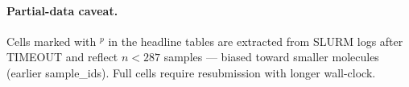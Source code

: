 \documentclass[11pt]{article}
\begin{document}
\paragraph{Partial-data caveat.} Cells marked with $^p$ in the headline tables
are extracted from SLURM logs after TIMEOUT and reflect $n<287$ samples — biased
toward smaller molecules (earlier sample\_ids). Full cells require resubmission
with longer wall-clock.
\end{document}
